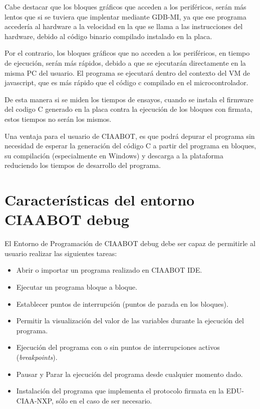 Cabe destacar que los bloques gráficos que acceden a los periféricos,
serán más lentos que si se tuviera que implentar mediante GDB-MI, ya que ese programa accedería al hardware a la velocidad en la que
se llama a las instrucciones del hardware, debido al código binario compilado
instalado en la placa.

Por el contrario, los bloques gráficos que no acceden a los periféricos, en tiempo
de ejecución, serán más rápidos, debido a que se ejecutarán directamente en la
misma PC del usuario. El programa se ejecutará dentro del contexto del VM de
javascript, que es más rápido que el código c compilado en el microcontrolador.

De esta manera si se miden los tiempos de ensayos, cuando se instala el firmware
del codigo C generado en la placa contra la ejecución de los bloques con firmata, estos tiempos no serán los mismos.

Una ventaja para el usuario de CIAABOT, es que podrá depurar el programa sin necesidad de esperar la generación del código C a partir del programa en bloques, su compilación (especialmente en Windows) y descarga a la plataforma reduciendo los tiempos de desarrollo del programa.


\section{Características del entorno CIAABOT debug}
\label{sec:Características del entorno CIAABOT debug}

El Entorno de Programación de CIAABOT debug debe ser capaz de permitirle al usuario realizar las siguientes tareas:

\begin{itemize}
	\item Abrir o importar un programa realizado en CIAABOT IDE.
	\item Ejecutar un programa bloque a bloque.	
	\item Establecer puntos de interrupción  (puntos de parada en los bloques).
	\item Permitir la visualización del valor de las variables durante la ejecución del programa.
	\item Ejecución del programa con o sin puntos de interrupciones activos (\emph{breakpoints}).
	\item Pausar y Parar la ejecución del programa desde cualquier momento dado.
	\item Instalación del programa que implementa el protocolo firmata en la EDU-CIAA-NXP, sólo en el caso de ser necesario.
\end{itemize}

